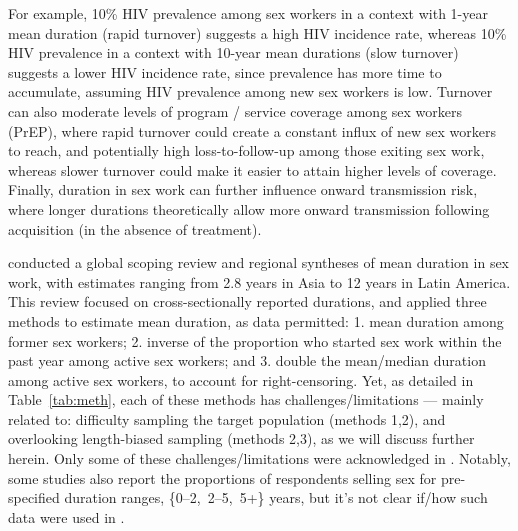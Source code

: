 For example, 10\% HIV prevalence among sex workers
in a context with 1-year mean duration (rapid turnover)
suggests a high HIV incidence rate, whereas 10\% HIV prevalence
in a context with 10-year mean durations (slow turnover)
suggests a lower HIV incidence rate,
since prevalence has more time to accumulate,
assuming HIV prevalence among new sex workers is low.\cite{Knight2020,Anderegg2024}
Turnover can also moderate levels of
program / service coverage among sex workers (\eg PrEP),
where rapid turnover could create a constant influx of new sex workers to reach, and
potentially high loss-to-follow-up among those exiting sex work,
whereas slower turnover could make it easier to attain higher levels of coverage.
Finally, duration in sex work can further influence onward transmission risk,
where longer durations theoretically allow
more onward transmission following acquisition (in the absence of treatment).
\par
\citet{Fazito2012} conducted
a global scoping review and regional syntheses of mean duration in sex work,
with estimates ranging from 2.8 years in Asia to 12 years in Latin America.
This review focused on cross-sectionally reported durations,
and applied three methods to estimate mean duration, as data permitted:
1. mean duration among former sex workers;
2. inverse of the proportion who started sex work within the past year among active sex workers; and
3. double the mean/median duration among active sex workers, to account for right-censoring.
Yet, as detailed in Table~\ref{tab:meth},
each of these methods has challenges/limitations --- mainly related to:
difficulty sampling the target population (methods 1,2),\cite{Ward2006} and
overlooking length-biased sampling (methods 2,3),\cite{Kafadar2009}
as we will discuss further herein.
Only some of these challenges/limitations were acknowledged in \citep{Fazito2012}.
Notably, some studies also report the proportions of respondents
selling sex for pre-specified duration ranges, \eg \mbox{\{0--2, 2--5, 5+\}} years,
but it's not clear if/how such data were used in \citep{Fazito2012}.
